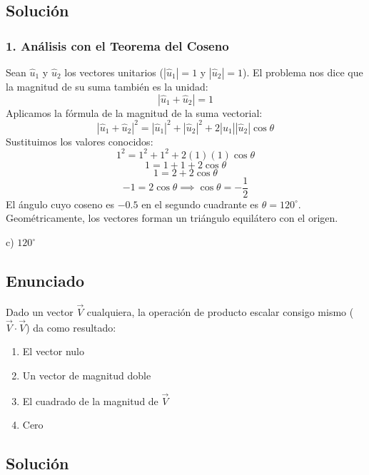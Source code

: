 \documentclass[12pt, a4paper]{article}
\begin{document}
\subsection*{Solución}

\subsubsection*{1. Análisis con el Teorema del Coseno}
Sean $\hat{u}_1$ y $\hat{u}_2$ los vectores unitarios ($|\hat{u}_1| = 1$ y $|\hat{u}_2| = 1$). El problema nos dice que la magnitud de su suma también es la unidad:
$$ |\hat{u}_1 + \hat{u}_2| = 1 $$
Aplicamos la fórmula de la magnitud de la suma vectorial:
$$ |\hat{u}_1 + \hat{u}_2|^2 = |\hat{u}_1|^2 + |\hat{u}_2|^2 + 2|\hat{u}_1||\hat{u}_2| \cos\theta $$
Sustituimos los valores conocidos:
$$ 1^2 = 1^2 + 1^2 + 2(1)(1) \cos\theta $$
$$ 1 = 1 + 1 + 2\cos\theta $$
$$ 1 = 2 + 2\cos\theta $$
$$ -1 = 2\cos\theta \implies \cos\theta = -\frac{1}{2} $$
El ángulo cuyo coseno es $-0.5$ en el segundo cuadrante es $\theta = 120^\circ$. Geométricamente, los vectores forman un triángulo equilátero con el origen.

\begin{tcolorbox}[colback=green!5!white, colframe=green!50!black, title=Respuesta Final]
\centering \Large c) $120^\circ$
\end{tcolorbox}

\newpage


\subsection*{Enunciado}
Dado un vector $\vec{V}$ cualquiera, la operación de producto escalar consigo mismo ($\vec{V} \cdot \vec{V}$) da como resultado:
\begin{enumerate}[label=\alph*)]
    \item El vector nulo
    \item Un vector de magnitud doble
    \item El cuadrado de la magnitud de $\vec{V}$
    \item Cero
\end{enumerate}

\subsection*{Solución}
\end{document}
